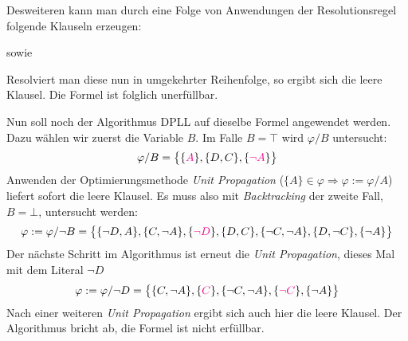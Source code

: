 Desweiteren kann man durch eine Folge von Anwendungen der Resolutionsregel folgende Klauseln erzeugen:
\begin{prooftree}
\end{prooftree}
sowie
\begin{prooftree}
\end{prooftree}
Resolviert man diese nun in umgekehrter Reihenfolge, so ergibt sich die leere Klausel. Die Formel ist folglich
unerfüllbar.

\vspace{2em}

Nun soll noch der Algorithmus DPLL auf dieselbe Formel angewendet werden. Dazu wählen wir zuerst die Variable $B$. Im
Falle $B = \top$ wird $\varphi / B$ untersucht:
\[
  \varphi / B = \big\{ \{\cm{A}\}, \{D, C\}, \{\cm{\neg A}\} \big\}
\]
Anwenden der Optimierungsmethode \emph{Unit Propagation} ($\{A\} \in \varphi \Rightarrow \varphi := \varphi / A$)
liefert sofort die leere Klausel. Es muss also mit \emph{Backtracking} der zweite Fall, $B = \bot$, untersucht werden:
\[
  \varphi := \varphi / \neg B = \big\{ \{\neg D, A\}, \{C, \neg A\}, \{\cm{\neg D}\}, \{D, C\}, \{\neg C, \neg A\},
  \{D, \neg C\}, \{\neg A\} \big\}
\]
Der nächste Schritt im Algorithmus ist erneut die \emph{Unit Propagation}, dieses Mal mit dem Literal $\neg D$
\[
  \varphi := \varphi / \neg D = \big\{ \{C, \neg A\}, \{\cm{C}\}, \{\neg C, \neg A\}, \{\cm{\neg C}\}, \{\neg A\} \big\}
\]
Nach einer weiteren \emph{Unit Propagation} ergibt sich auch hier die leere Klausel. Der Algorithmus bricht ab, die
Formel ist nicht erfüllbar.

